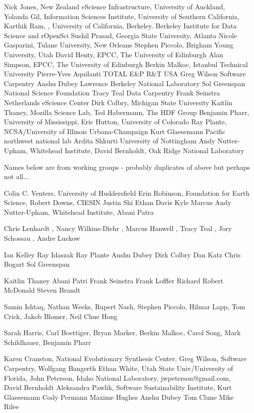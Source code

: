 \documentclass[11pt, oneside]{amsart}
\begin{document}
Nick Jones, New Zealand eScience Infrastructure, University of Auckland, 
Yolanda Gil, Information Sciences Institute, University of Southern California, 
Karthik Ram, , University of California, Berkeley. Berkeley Institute for Data Science and rOpenSci
Sushil Prasad, Georgia State University, Atlanta 
Nicole Gasparini, Tulane University, New Orleans
Stephen Piccolo,  Brigham Young University, Utah
David Henty,  EPCC, The University of Edinburgh
Alan Simpson,  EPCC, The University of Edinburgh
Berkin Malkoc, Istanbul Technical University
Pierre-Yves Aquilanti TOTAL E\&P R\&T USA
Greg Wilson  Software Carpentry
Anshu Dubey  Lawrence Berkeley National Laboratory
Sol Greenspan  National Science Foundation
Tracy Teal Data Carpentry
Frank Seinstra Netherlands eScience Center
Dirk Colbry, Michigan State University
Kaitlin Thaney,  Mozilla Science Lab, 
Ted Habermann, The HDF Group
Benjamin Pharr, University of Mississippi, 
Eric Hutton,  University of Colorado
Ray Plante, NCSA/University of Illinois Urbana-Champaign
Kurt Glaesemann Pacific northwest national lab
Ardita Shkurti University of Nottingham
Andy Nutter-Upham, Whitehead Institute,
David Bernholdt, Oak Ridge National Laboratory

Names below are from working groups - probably duplicates of above but perhaps not all...

Colin C. Venters, University of Huddersfield
Erin Robinson, Foundation for Earth Science, 
Robert Downs, CIESIN 
Justin Shi
Ethan Davis 
Kyle Marcus
Andy Nutter-Upham, Whitehead Institute, 
Abani Patra

Chris Lenhardt , Nancy Wilkins-Diehr , Marcus Hanwell , Tracy Teal , Jory Schossau , Andre Luckow 

Ian Kelley 
Ray Idaszak 
Ray Plante 
Anshu Dubey
Dirk Colbry 
Dan Katz
Chris Bogart
Sol Greenspan 

Kaitlin Thaney
Abani Patri
Frank Seinstra
Frank Loffler
Richard
Robert McDonald
Steven Brandt

Samin Ishtaq, Nathan Weeks, Rupert Nash, Stephen Piccolo, Hilmar Lapp, Tom Crick, Jakob Blomer, Neil Chue Hong

Sarah Harris, Carl Boettiger, Bryan Marker, Berkin Malkoc, Carol Song, Mark Schildhauer, Benjamin Pharr

Karen Cranston, National Evolutionary Synthesis Center,
Greg Wilson, Software Carpentry, 
Wolfgang Bangerth 
Ethan White, Utah State Univ/University of Florida, 
John Peterson, Idaho National Laboratory, jwpeterson@gmail.com, 
David Bernholdt
Aleksandra Pawlik, Software Sustainability Institute, 
Kurt Glaesemann
Cody Permann
Maxime Hughes
Anshu Dubey
Tom Clune
Mike Rilee





\end{document}
